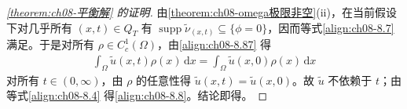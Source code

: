 \documentclass[../../main.tex]{subfiles}%
\begin{document}
\begin{proof}[\cref{theorem:ch08-平衡解} 的证明]
由\cref{theorem:ch08-omega极限非空}(ii)，在当前假设下对几乎所有 $(x,t)\in Q_T$ 有 $\operatorname{supp}\tilde\nu_{(x,t)}\subseteq\{\phi=0\}$，因而等式\eqref{align:ch08-8.7} 满足。于是对所有 $\rho\in C^1_c(\Omega)$，由\eqref{align:ch08-8.87} 得
\begin{align*}
\int_\Omega\tilde u(x,t)\rho(x)\,\mathrm{d}x=\int_\Omega\tilde u(x,0)\rho(x)\,\mathrm{d}x
\end{align*}
对所有 $t\in(0,\infty)$，由 $\rho$ 的任意性得 $\tilde u(x,t)=\tilde u(x,0)$。故 $\tilde u$ 不依赖于 $t$；由等式\eqref{align:ch08-8.4} 得\eqref{align:ch08-8.8}。结论即得。
\end{proof}
\end{document}
